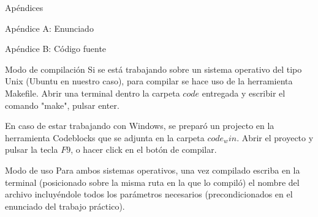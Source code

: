 \begin{section}{Apéndices}
	\begin{subsection}{Apéndice A: Enunciado}
		
	\end{subsection}
	\begin{subsection}{Apéndice B: Código fuente}
		\begin{subsection}{Modo de compilación}
			Si se está trabajando sobre un sistema operativo del tipo Unix (Ubuntu en nuestro caso), para compilar se hace uso de la herramienta Makefile.			
			Abrir una terminal dentro la carpeta $code$ entregada y escribir el comando "make", pulsar enter.
			
			En caso de estar trabajando con Windows, se preparó un projecto en la herramienta Codeblocks que se adjunta en la carpeta $code_win$.
			Abrir el proyecto y pulsar la tecla $F9$, o hacer click en el botón de compilar.
		\end{subsection}	
		\begin{subsection}{Modo de uso}
			Para ambos sistemas operativos, una vez compilado escriba en la terminal (posicionado sobre la misma ruta en la que lo compiló) el nombre del archivo incluyéndole todos los parámetros necesarios (precondicionados en el enunciado del trabajo práctico).
		\end{subsection}	
	\end{subsection}	
\end{section}
